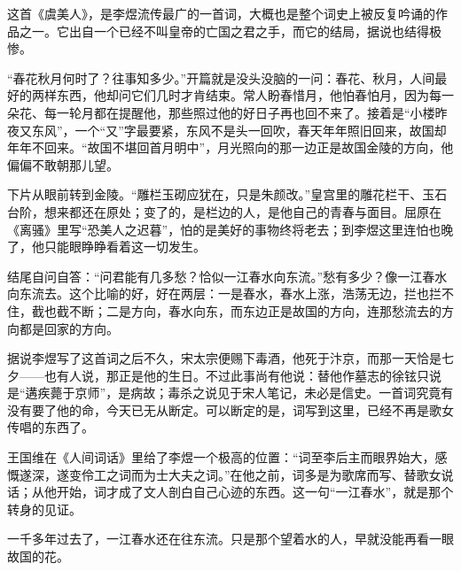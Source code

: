 \begin{appreciation}
这首《虞美人》，是李煜流传最广的一首词，大概也是整个词史上被反复吟诵的作品之一。它出自一个已经不叫皇帝的亡国之君之手，而它的结局，据说也结得极惨。

“春花秋月何时了？往事知多少。”开篇就是没头没脑的一问：春花、秋月，人间最好的两样东西，他却问它们几时才肯结束。常人盼春惜月，他怕春怕月，因为每一朵花、每一轮月都在提醒他，那些照过他的好日子再也回不来了。接着是“小楼昨夜又东风”，一个“又”字最要紧，东风不是头一回吹，春天年年照旧回来，故国却年年不回来。“故国不堪回首月明中”，月光照向的那一边正是故国金陵的方向，他偏偏不敢朝那儿望。

下片从眼前转到金陵。“雕栏玉砌应犹在，只是朱颜改。”皇宫里的雕花栏干、玉石台阶，想来都还在原处；变了的，是栏边的人，是他自己的青春与面目。屈原在《离骚》里写“恐美人之迟暮”，怕的是美好的事物终将老去；到李煜这里连怕也晚了，他只能眼睁睁看着这一切发生。

结尾自问自答：“问君能有几多愁？恰似一江春水向东流。”愁有多少？像一江春水向东流去。这个比喻的好，好在两层：一是春水，春水上涨，浩荡无边，拦也拦不住，截也截不断；二是方向，春水向东，而东边正是故国的方向，连那愁流去的方向都是回家的方向。

据说李煜写了这首词之后不久，宋太宗便赐下毒酒，他死于汴京，而那一天恰是七夕——也有人说，那正是他的生日。不过此事尚有他说：替他作墓志的徐铉只说是“遘疾薨于京师”，是病故；毒杀之说见于宋人笔记，未必是信史。一首词究竟有没有要了他的命，今天已无从断定。可以断定的是，词写到这里，已经不再是歌女传唱的东西了。

王国维在《人间词话》里给了李煜一个极高的位置：“词至李后主而眼界始大，感慨遂深，遂变伶工之词而为士大夫之词。”在他之前，词多是为歌席而写、替歌女说话；从他开始，词才成了文人剖白自己心迹的东西。这一句“一江春水”，就是那个转身的见证。

一千多年过去了，一江春水还在往东流。只是那个望着水的人，早就没能再看一眼故国的花。
\end{appreciation}
